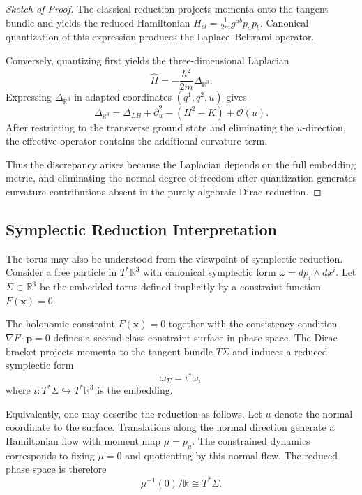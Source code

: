 \begin{proof}[Sketch of Proof]
The classical reduction projects momenta onto the tangent bundle and 
    yields the reduced Hamiltonian $H_{cl} = \frac{1}{2m} g^{ab} p_a p_b$.
    Canonical quantization of this expression produces 
    the Laplace--Beltrami operator.

Conversely, quantizing first yields the three-dimensional Laplacian
\begin{equation}
\hat H = -\frac{\hbar^2}{2m} \Delta_{\mathbb{R}^3}.
\end{equation}
Expressing $\Delta_{\mathbb{R}^3}$ in adapted coordinates $(q^1,q^2,u)$ gives
\begin{equation}
\Delta_{\mathbb{R}^3} = \Delta_{LB} + \partial_u^2 - (H^2-K) + \mathcal{O}(u).
\end{equation}
After restricting to the transverse ground state and eliminating the $u$-direction,
    the effective operator contains the additional curvature term.

Thus the discrepancy arises because the Laplacian depends on the full embedding 
    metric, and eliminating the normal degree of freedom after quantization 
generates curvature contributions absent in the purely algebraic Dirac reduction.
\end{proof}

\subsection{Symplectic Reduction Interpretation}

The torus may also be understood from the viewpoint of symplectic reduction. 
Consider a free particle in $T^*\mathbb{R}^3$ with canonical symplectic form 
$\omega = d p_i \wedge d x^i$. Let $\Sigma \subset \mathbb{R}^3$ be the 
embedded torus defined implicitly by a constraint function $F(\mathbf{x})=0$.

The holonomic constraint $F(\mathbf{x})=0$ together with the consistency condition
$\nabla F \cdot \mathbf{p}=0$ defines a second-class constraint surface in 
phase space. The Dirac bracket projects momenta to the tangent bundle $T\Sigma$ 
and induces a reduced symplectic form
\begin{equation}
\omega_{\Sigma} = \iota^* \omega,
\end{equation}
where $\iota: T^*\Sigma \hookrightarrow T^*\mathbb{R}^3$ is the embedding.

Equivalently, one may describe the reduction as follows. Let $u$ denote the 
normal coordinate to the surface. Translations along the normal direction 
generate a Hamiltonian flow with moment map $\mu = p_u$. The constrained 
dynamics corresponds to fixing $\mu=0$ and quotienting by this normal flow.
The reduced phase space is therefore
\begin{equation}
\mu^{-1}(0)/\mathbb{R} \cong T^*\Sigma.
\end{equation}

